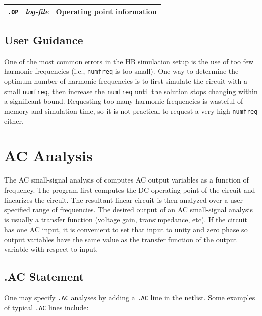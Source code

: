 \begin{table}[htbp]
\begin{tabularx}{\linewidth}{|p{2.75in}|Y|Y|}
\texttt{.OP} & \emph{log-file} & Operating point information \\ \hline

  \end{tabularx}
\end{table}

\subsection{User Guidance}

One of the most common errors in the HB simulation setup is the use of
too few harmonic frequencies (i.e., \texttt{numfreq} is too
small). One way to determine the optimum number of harmonic
frequencies is to first simulate the circuit with a small
\texttt{numfreq}, then increase the \texttt{numfreq} until the
solution stops changing within a significant bound.  Requesting too
many harmonic frequencies is wasteful of memory and simulation time,
so it is not practical to request a very high \texttt{numfreq} either.

\section{AC Analysis}
\label{AC_Analysis}
\label{AC_Sweep_Overview}
  
 

The AC small-signal analysis of \Xyce{} computes AC output variables
as a function of frequency. The program first computes the DC
operating point of the circuit and linearizes the circuit. The
resultant linear circuit is then analyzed over a user-specified range
of frequencies. The desired output of an AC small-signal analysis is
usually a transfer function (voltage gain, transimpedance, etc). If
the circuit has one AC input, it is convenient to set that input to
unity and zero phase so output variables have the same value as the
transfer function of the output variable with respect to input.

\subsection{.AC Statement}

One may specify \verb|.AC| analyses by adding a \verb|.AC| line in the
netlist.  Some examples of typical \verb|.AC| lines include:


